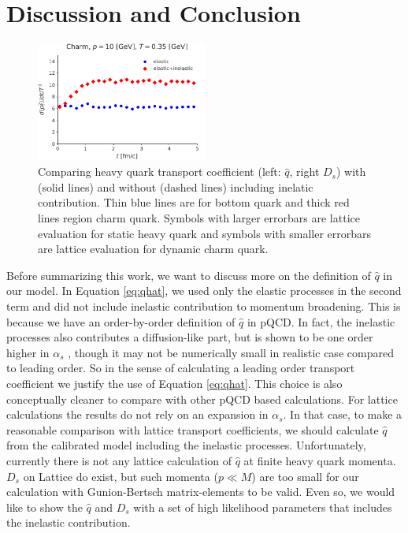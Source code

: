 \documentclass[aps, prc, reprint, amsmath, groupedaddress, nofootinbib]{revtex4-1}
\begin{document}
\section{Discussion and Conclusion}\label{section:conclusion}
\begin{figure}
\includegraphics[width=0.5\textwidth]{qhat_full.pdf}
\caption{Comparing heavy quark transport coefficient (left: $\hat{q}$, right $D_s$) with (solid lines) and without (dashed lines) including inelatic contribution. Thin blue lines are for bottom quark and thick red lines region charm quark. Symbols with larger errorbars are lattice evaluation for static heavy quark and symbols with smaller errorbars are lattice evaluation for dynamic charm quark.}\label{plots:transport_full}
\end{figure}
Before summarizing this work, we want to discuss more on the definition of $\hat{q}$ in our model.
In Equation \ref{eq:qhat}, we used only the elastic processes in the second term and did not include inelastic contribution to momentum broadening.
This is because we have an order-by-order definition of $\hat{q}$ in pQCD.
In fact, the inelastic processes also contributes a diffusion-like part, but is shown to be one order higher in $\alpha_s$ \cite{Ghiglieri:2015ala}, though it may not be numerically small in realistic case compared to leading order.
So in the sense of calculating a leading order transport coefficient we justify the use of Equation \ref{eq:qhat}. 
This choice is also conceptually cleaner to compare with other pQCD based calculations.
For lattice calculations the results do not rely on an expansion in $\alpha_s$.
In that case, to make a reasonable comparison with lattice transport coefficients, we should calculate $\hat{q}$ from the calibrated model including the inelastic processes.
Unfortunately, currently there is not any lattice calculation of $\hat{q}$ at finite heavy quark momenta.  
$D_s$ on Lattice do exist, but such momenta ($p \ll M$) are too small for our calculation with Gunion-Bertsch matrix-elements to be valid.
Even so, we would like to show the $\hat{q}$ and $D_s$ with a set of high likelihood parameters that includes the inelastic contribution.
\end{document}
